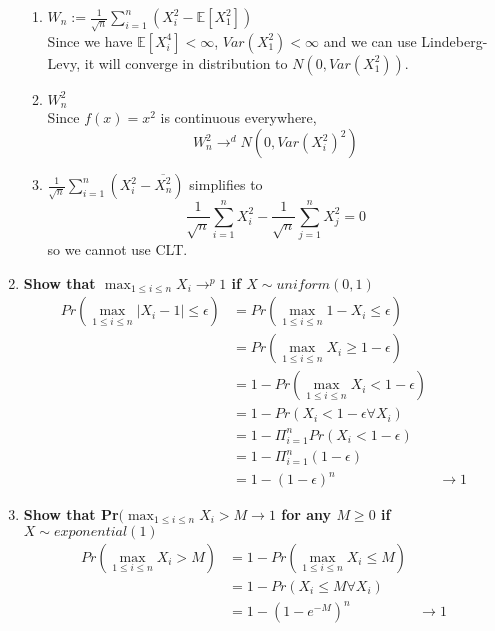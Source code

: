 \documentclass[]{article}
\newcommand{\sumin}{\sum\limits_{i=1}^n} %
\newcommand{\E}{\mathbb{E}}
\begin{document}
\begin{enumerate}[label = (\roman*)]
\begin{enumerate}[label = (\alph*)]

\item $W_n := \frac{1}{\sqrt{n}}\sumin (X_i^2-\E[X_1^2])$ \\
Since we have $\E[X_i^4]<\infty$, $Var(X_1^2)<\infty$ and we can use Lindeberg-Levy, it will converge in distribution to $N(0,Var(X_1^2)) $.

\item $W_n^2$\\
Since $f(x) = x^2$ is continuous everywhere, 
\[W_n^2 \rightarrow^d N(0,Var(X_i^2)^2)\]

\item $\frac{1}{\sqrt{n}} \sumin (X_i^2 -\overline{X_n^2})$ simplifies to 
\[\frac{1}{\sqrt{n}} \sumin X_i^2 - \frac{1}{\sqrt{n}} \sum_{j=1}^n X_j^2 = 0 \]
so we cannot use CLT. 

\end{enumerate}


\item \textbf{Show that $\max_{1\le i \le n} X_i \rightarrow^p 1$ if $X \sim uniform(0,1)$}
\begin{align*}
Pr(\max_{1\le i \le n} |X_i -1|\le \epsilon) 
& = Pr(\max_{1\le i \le n} 1-X_i \le \epsilon)
\\
& = Pr(\max_{1\le i \le n} X_i \ge 1-\epsilon)
\\
& = 1-Pr(\max_{1\le i \le n} X_i < 1-\epsilon)
\\
& = 1-Pr(X_i < 1-\epsilon \forall X_i)
\\
& = 1-\Pi_{i=1}^n Pr(X_i < 1-\epsilon)
\\
& = 1-\Pi_{i=1}^n (1-\epsilon)
\\
& = 1- (1-\epsilon)^n 
& \rightarrow 1
\end{align*}


\item \textbf{Show that Pr$(\max_{1\le i \le n} X_i >M \rightarrow 1$ for any $M\ge 0$ if $X \sim exponential(1)$}
\begin{align*}
Pr(\max_{1\le i \le n} X_i >M) 
& = 1- Pr(\max_{1\le i \le n} X_i \le M) 
\\
& = 1- Pr(X_i \le M \forall X_i)\\
& = 1 - (1-e^{-M})^n
& \rightarrow 1
\end{align*}

\end{enumerate}
\end{document}
